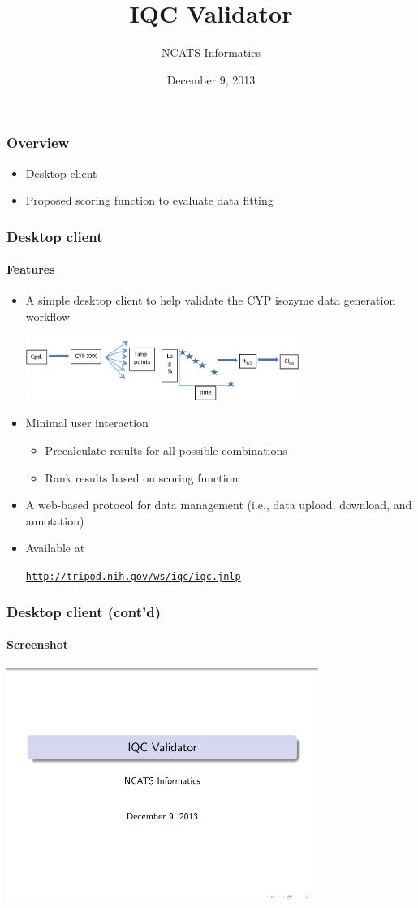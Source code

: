 \documentclass{beamer}
\title{IQC Validator}
\author{NCATS Informatics}
\date[]%
{December 9, 2013}
\begin{document}
\begin{frame}
  \titlepage
\end{frame}

\begin{frame}
\frametitle{Overview}
\begin{itemize}
\item Desktop client
\item Proposed scoring function to evaluate data fitting
\end{itemize}
\end{frame}

\begin{frame}
\frametitle{Desktop client}
\framesubtitle{Features}
\begin{itemize}
\item A simple desktop client to help validate the CYP isozyme data
  generation workflow 
\centerline{\includegraphics[width=3.5in]{iqc-flow}}
\item Minimal user interaction
\begin{itemize}
  \item Precalculate results for all possible combinations
  \item Rank results based on scoring function
\end{itemize}
\item A web-based protocol for data management (i.e., data upload,
  download, and annotation)
\item Available at
\centerline{\href{http://tripod.nih.gov/ws/iqc/iqc.jnlp}{\texttt{http://tripod.nih.gov/ws/iqc/iqc.jnlp}}}
\end{itemize}
\end{frame}

\begin{frame}
\frametitle{Desktop client (cont'd)}
\framesubtitle{Screenshot}
\centerline{\includegraphics[width=4in]{iqc-validator}}
\end{frame}
\end{document}
